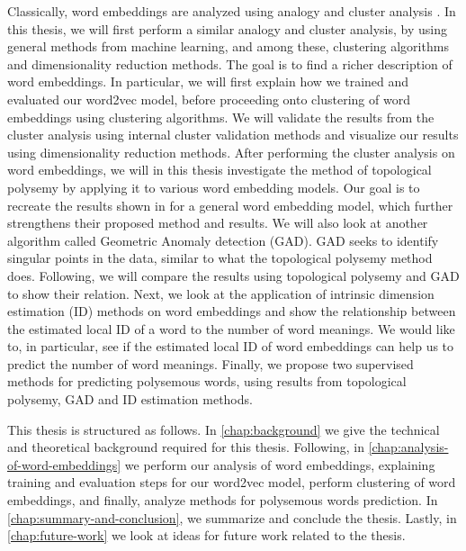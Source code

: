 Classically, word embeddings are analyzed using analogy and cluster analysis \cite{mikolov2013a,mikolov2013b,walkowiak-gniewkowski-2019-evaluation}. In this thesis, we will first perform a similar analogy and cluster analysis, by using general methods from machine learning, and among these, clustering algorithms and dimensionality reduction methods. The goal is to find a richer description of word embeddings. In particular, we will first explain how we trained and evaluated our word2vec model, before proceeding onto clustering of word embeddings using clustering algorithms. We will validate the results from the cluster analysis using internal cluster validation methods and visualize our results using dimensionality reduction methods. After performing the cluster analysis on word embeddings, we will in this thesis investigate the method of topological polysemy by applying it to various word embedding models. Our goal is to recreate the results shown in \cite{jakubowski2020topology} for a general word embedding model, which further strengthens their proposed method and results. We will also look at another algorithm called Geometric Anomaly detection (GAD). GAD seeks to identify singular points in the data, similar to what the topological polysemy method does. Following, we will compare the results using topological polysemy and GAD to show their relation. Next, we look at the application of intrinsic dimension estimation (ID) methods on word embeddings and show the relationship between the estimated local ID of a word to the number of word meanings. We would like to, in particular, see if the estimated local ID of word embeddings can help us to predict the number of word meanings. Finally, we propose two supervised methods for predicting polysemous words, using results from topological polysemy, GAD and ID estimation methods.

This thesis is structured as follows. In \cref{chap:background} we give the technical and theoretical background required for this thesis. Following, in \cref{chap:analysis-of-word-embeddings} we perform our analysis of word embeddings, explaining training and evaluation steps for our word2vec model, perform clustering of word embeddings, and finally, analyze methods for polysemous words prediction. In \cref{chap:summary-and-conclusion}, we summarize and conclude the thesis. Lastly, in \cref{chap:future-work} we look at ideas for future work related to the thesis.